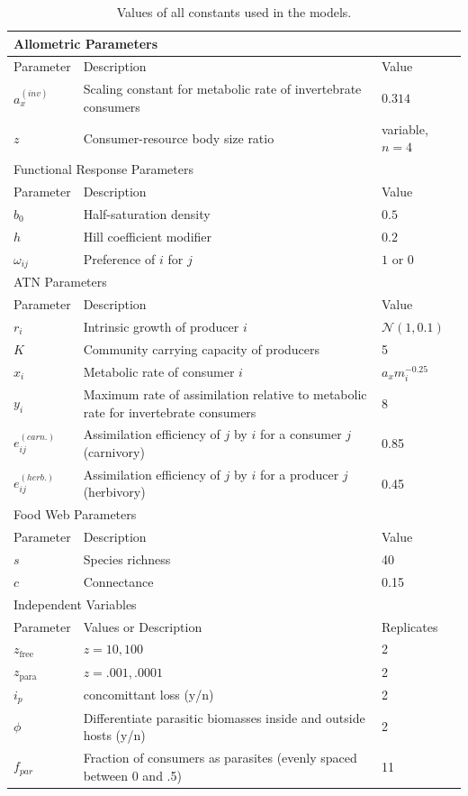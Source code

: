\documentclass[11pt]{amsart}
\begin{document}
\begin{table}
\begin{tabularx}{\textwidth}{|l|X|l|}
\hline
\multicolumn{3}{|X|}{Allometric Parameters}\\
\hline
Parameter&Description&Value\\
\hline
$a_x^{(inv)}$&Scaling constant for metabolic rate of invertebrate consumers & $0.314$\\
$z$&Consumer-resource body size ratio&variable, $n=4$\\
\hline
\hline
\multicolumn{3}{|X|}{Functional Response Parameters}\\
\hline
Parameter&Description&Value\\
\hline
$b_0$&Half-saturation density&$0.5$\\
$h$&Hill coefficient modifier& $0.2$\\
$\omega_{ij}$&Preference of $i$ for $j$&$1$ or $0$\\
\hline
\hline
\multicolumn{3}{|X|}{ATN Parameters}\\
\hline
Parameter&Description&Value\\
\hline
$r_i$&Intrinsic growth of producer $i$&$\mathcal{N}(1,0.1)$\\
$K$&Community carrying capacity of producers &5\\
$x_i$&Metabolic rate of consumer $i$&$a_x m_i^{-0.25}$\\
$y_i$&Maximum rate of assimilation relative to metabolic rate for invertebrate consumers & 8\\
$e_{ij}^{(carn.)}$&Assimilation efficiency of $j$ by $i$ for a consumer $j$ (carnivory) & 0.85\\
$e_{ij}^{(herb.)}$&Assimilation efficiency of $j$ by $i$ for a producer $j$ (herbivory) & 0.45\\
\hline
\hline
\multicolumn{3}{|X|}{Food Web Parameters}\\
\hline
Parameter&Description&Value\\
\hline
$s$&Species richness&40\\
$c$&Connectance & 0.15\\
\hline
\hline
\multicolumn{3}{|X|}{Independent Variables}\\
\hline
Parameter & Values or Description & Replicates\\
$z_\text{free}$&$z=10,100$&2\\
$z_\text{para}$&$z=.001,.0001$&2\\
$i_p$&concomittant loss (y/n)&2\\
$\phi$&Differentiate parasitic biomasses inside and outside hosts (y/n)&2\\
$f_{par}$&Fraction of consumers as parasites (evenly spaced between 0 and .5)&11\\
\hline
\end{tabularx}
\caption{Values of all constants used in the models.  \label{tab:param}}
\end{table}
\newpage
\end{document}
